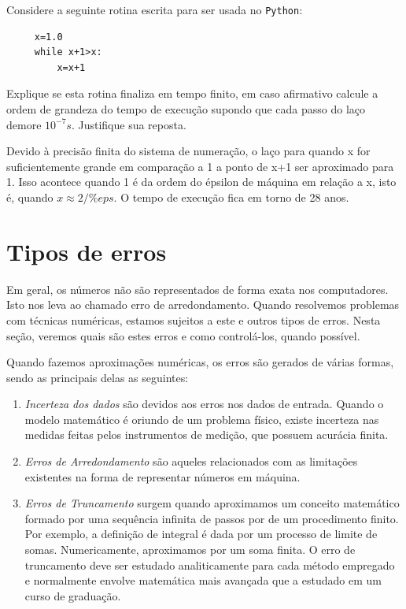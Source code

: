 \ifisoctave
\begin{exer}Considere a seguinte rotina escrita para ser usada no \verb+Python+:
 \begin{verbatim}
     x=1.0
     while x+1>x:
         x=x+1
 \end{verbatim}
 Explique se esta rotina finaliza em tempo finito, em caso afirmativo calcule a ordem de grandeza do tempo de execução supondo que cada passo do laço demore $10^{-7}s$. Justifique sua reposta.
 \end{exer}
\begin{resp}
 Devido à precisão finita do sistema de numeração, o laço para quando x for suficientemente grande em comparação a 1 a ponto de x+1 ser aproximado para 1. Isso acontece quando 1 é da ordem do épsilon de máquina em relação a x, isto é, quando $x\approx 2/\%eps$. O tempo de execução fica em torno de 28 anos.
\end{resp}
 \fi


\section{Tipos de erros}

Em geral, os números não são representados de forma exata nos computadores. Isto nos leva ao chamado erro de arredondamento. Quando resolvemos problemas com técnicas numéricas, estamos sujeitos a este e outros tipos de erros. Nesta seção, veremos quais são estes erros e como controlá-los, quando possível.

Quando fazemos aproximações numéricas, os erros são gerados de várias formas, sendo as principais delas as seguintes:
\begin{enumerate}
\item \emph{Incerteza dos dados} são devidos aos erros nos dados de entrada. Quando o modelo matemático é oriundo de um problema físico, existe incerteza nas medidas feitas pelos instrumentos de medição, que possuem acurácia finita.
\item \emph{Erros de Arredondamento} são aqueles relacionados com as limitações existentes na forma de representar números em máquina.
\item \emph{Erros de Truncamento} surgem quando aproximamos um conceito matemático formado por uma sequência infinita de passos por de um procedimento finito. Por exemplo, a definição de integral é dada por um processo de limite de somas. Numericamente, aproximamos por um soma finita. O erro de truncamento deve ser estudado analiticamente para cada método empregado e normalmente envolve matemática mais avançada que a estudado em um curso de graduação.
\end{enumerate}

